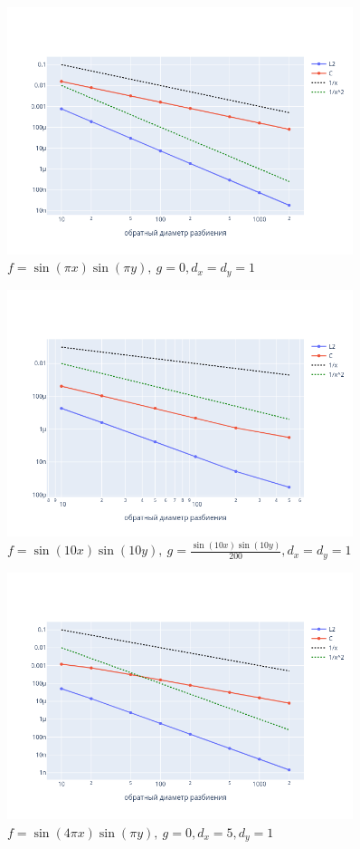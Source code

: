 \documentclass{report}
\begin{document}
\begin{figure}[!h]
	\centering
	\includegraphics[width=0.9\textwidth]{img/pixpiy.png}
	\caption{$f = \sin(\pi x) \sin(\pi y),~ g = 0, d_x = d_y = 1$}
\end{figure}

\begin{figure}[!h]
	\centering
	\includegraphics[width=0.9\textwidth]{img/10x10y.png}
	\caption{$f = \sin(10 x) \sin(10 y), ~ g = \frac{\sin(10 x) \sin(10 y)}{200} , d_x = d_y = 1$}
\end{figure}

\begin{figure}[!h]
	\centering
	\includegraphics[width=0.9\textwidth]{img/4pixpiy.png}
	\caption{ $f = \sin(4 \pi x) \sin(\pi y), ~ g = 0, d_x = 5, d_y = 1$}
\end{figure}
\end{document}

